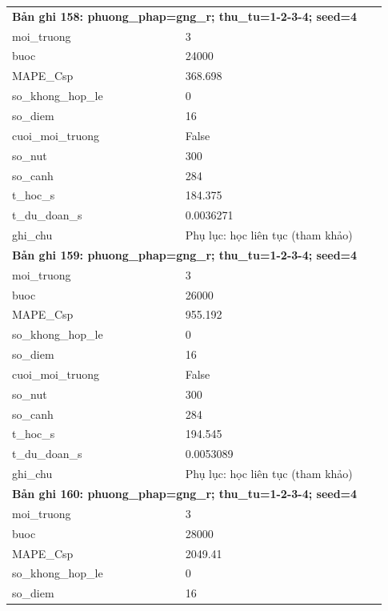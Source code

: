 \begin{longtable}{p{0.43\linewidth}p{0.50\linewidth}}
\midrule
\multicolumn{2}{p{0.95\linewidth}}{\textbf{Bản ghi 158: phuong\_phap=gng\_r; thu\_tu=1-2-3-4; seed=4}} \\
moi\_\allowbreak truong & 3 \\
buoc & 24000 \\
MAPE\_\allowbreak Csp & 368.698 \\
so\_\allowbreak khong\_\allowbreak hop\_\allowbreak le & 0 \\
so\_\allowbreak diem & 16 \\
cuoi\_\allowbreak moi\_\allowbreak truong & False \\
so\_\allowbreak nut & 300 \\
so\_\allowbreak canh & 284 \\
t\_\allowbreak hoc\_\allowbreak s & 184.375 \\
t\_\allowbreak du\_\allowbreak doan\_\allowbreak s & 0.0036271 \\
ghi\_\allowbreak chu & Phụ lục: học liên tục (tham khảo) \\
\midrule
\multicolumn{2}{p{0.95\linewidth}}{\textbf{Bản ghi 159: phuong\_phap=gng\_r; thu\_tu=1-2-3-4; seed=4}} \\
moi\_\allowbreak truong & 3 \\
buoc & 26000 \\
MAPE\_\allowbreak Csp & 955.192 \\
so\_\allowbreak khong\_\allowbreak hop\_\allowbreak le & 0 \\
so\_\allowbreak diem & 16 \\
cuoi\_\allowbreak moi\_\allowbreak truong & False \\
so\_\allowbreak nut & 300 \\
so\_\allowbreak canh & 284 \\
t\_\allowbreak hoc\_\allowbreak s & 194.545 \\
t\_\allowbreak du\_\allowbreak doan\_\allowbreak s & 0.0053089 \\
ghi\_\allowbreak chu & Phụ lục: học liên tục (tham khảo) \\
\midrule
\multicolumn{2}{p{0.95\linewidth}}{\textbf{Bản ghi 160: phuong\_phap=gng\_r; thu\_tu=1-2-3-4; seed=4}} \\
moi\_\allowbreak truong & 3 \\
buoc & 28000 \\
MAPE\_\allowbreak Csp & 2049.41 \\
so\_\allowbreak khong\_\allowbreak hop\_\allowbreak le & 0 \\
so\_\allowbreak diem & 16 \\

\end{longtable}
